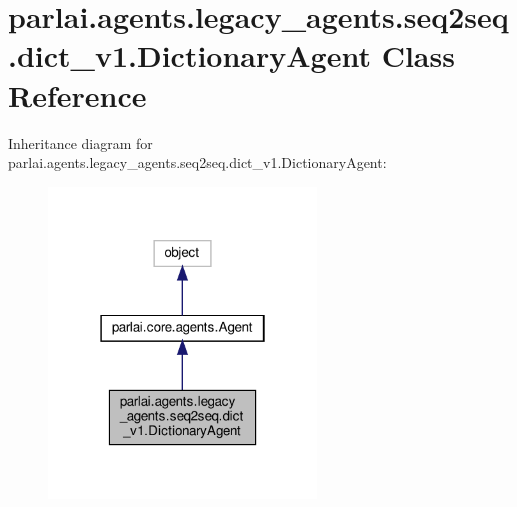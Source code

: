 \hypertarget{classparlai_1_1agents_1_1legacy__agents_1_1seq2seq_1_1dict__v1_1_1DictionaryAgent}{}\section{parlai.\+agents.\+legacy\+\_\+agents.\+seq2seq.\+dict\+\_\+v1.\+Dictionary\+Agent Class Reference}
\label{classparlai_1_1agents_1_1legacy__agents_1_1seq2seq_1_1dict__v1_1_1DictionaryAgent}


Inheritance diagram for parlai.\+agents.\+legacy\+\_\+agents.\+seq2seq.\+dict\+\_\+v1.\+Dictionary\+Agent\+:
\nopagebreak
\begin{figure}[H]
\begin{center}
\leavevmode
\includegraphics[width=202pt]{classparlai_1_1agents_1_1legacy__agents_1_1seq2seq_1_1dict__v1_1_1DictionaryAgent__inherit__graph}
\end{center}
\end{figure}


